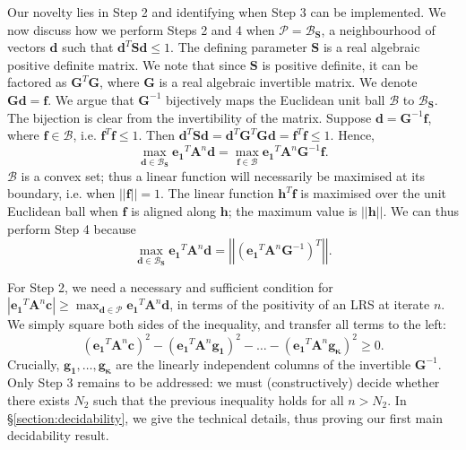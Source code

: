 Our novelty lies in Step 2 and identifying when Step 3 can be implemented. We now discuss how we perform Steps 2 and 4 when $\mathcal{P} = \mathcal{B}_\mathbf{S}$, a neighbourhood of vectors $\mathbf{d}$ such that $\mathbf{d}^T\mathbf{S}\mathbf{d} \le 1$. The defining parameter $\mathbf{S}$ is a real algebraic positive definite matrix. We note that since $\mathbf{S}$ is positive definite, it can be factored as $\mathbf{G}^T\mathbf{G}$, where $\mathbf{G}$ is a real algebraic invertible matrix. We denote $\mathbf{Gd} = \mathbf{f}$. We argue that $\mathbf{G}^{-1}$ bijectively maps the Euclidean unit ball $\mathcal{B}$ to $\mathcal{B}_\mathbf{S}$. The bijection is clear from the invertibility of the matrix. Suppose $\mathbf{d} = \mathbf{G}^{-1}\mathbf{f}$, where $\mathbf{f} \in \mathcal{B}$, i.e. $\mathbf{f}^T\mathbf{f} \le 1$. Then $\mathbf{d}^T\mathbf{Sd} = \mathbf{d}^T\mathbf{G}^T\mathbf{Gd} = \mathbf{f}^T\mathbf{f} \le 1.$
Hence,
\begin{equation}
\label{eq:bijectivemap}
\max_{\mathbf{d} \in \mathcal{B}_\mathbf{S}} \mathbf{e_1}^T\mathbf{A}^n\mathbf{d} = \max_{\mathbf{f} \in \mathcal{B}} \mathbf{e_1}^T\mathbf{A}^n\mathbf{G}^{-1}\mathbf{f}.
\end{equation}
$\mathcal{B}$ is a convex set; thus a linear function will necessarily be maximised at its boundary, i.e. when $||\mathbf{f}|| = 1$. The linear function $\mathbf{h}^T\mathbf{f}$ is maximised over the unit Euclidean ball when $\mathbf{f}$ is aligned along $\mathbf{h}$; the maximum value is $||\mathbf{h}||$. We can thus perform Step 4 because
\begin{equation}
\max_{\mathbf{d} \in \mathcal{B}_\mathbf{S}} \mathbf{e_1}^T\mathbf{A}^n\mathbf{d} = \left|\left|\left( \mathbf{e_1}^T\mathbf{A}^n\mathbf{G}^{-1} \right)^T\right|\right|.
\end{equation}

For Step 2, we need a necessary and sufficient condition for $|\mathbf{e_1}^T \mathbf{A}^n \mathbf{c}|\ge \max_{\mathbf{d} \in \mathcal{P}} \mathbf{e_1}^T\mathbf{A}^n\mathbf{d}$, in terms of the positivity of an LRS at iterate $n$. We simply square both sides of the inequality, and transfer all terms to the left: 
\begin{equation}
\label{eq:critical}
(\mathbf{e_1}^T \mathbf{A}^n \mathbf{c})^2 - (\mathbf{e_1}^T \mathbf{A}^n \mathbf{g_1})^2 - \dots - (\mathbf{e_1}^T \mathbf{A}^n \mathbf{g_\kappa})^2 \ge 0.
\end{equation}
Crucially, $\mathbf{g_1}, \dots, \mathbf{g_\kappa}$ are the linearly independent columns of the invertible $\mathbf{G}^{-1}$. Only Step 3 remains to be addressed: we must (constructively) decide whether there exists $N_2$ such that the previous inequality holds for all $n > N_2$. In \S\ref{section:decidability}, we give the technical details, thus proving our first main decidability result.

